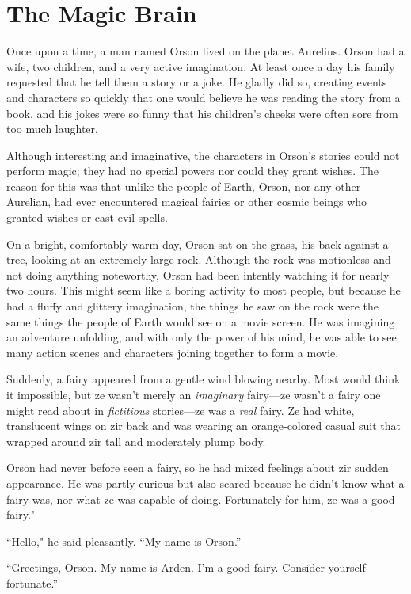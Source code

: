 \chapter{The Magic Brain}

Once upon a time, a man named Orson lived on the planet Aurelius. Orson had a wife, two children, and a very active imagination. At least once a day his family requested that he tell them a story or a joke. He gladly did so, creating events and characters so quickly that one would believe he was reading the story from a book, and his jokes were so funny that his children's cheeks were often sore from too much laughter.

Although interesting and imaginative, the characters in Orson's stories could not perform magic; they had no special powers nor could they grant wishes. The reason for this was that unlike the people of Earth, Orson, nor any other Aurelian, had ever encountered magical fairies or other cosmic beings who granted wishes or cast evil spells.

\timesep

On a bright, comfortably warm day, Orson sat on the grass, his back against a tree, looking at an extremely large rock. Although the rock was motionless and not doing anything noteworthy, Orson had been intently watching it for nearly two hours. This might seem like a boring activity to most people, but because he had a fluffy and glittery imagination, the things he saw on the rock were the same things the people of Earth would see on a movie screen. He was imagining an adventure unfolding, and with only the power of his mind, he was able to see many action scenes and characters joining together to form a movie.

Suddenly, a fairy appeared from a gentle wind blowing nearby. Most would think it impossible, but ze wasn't merely an \emph{imaginary} fairy—ze wasn't a fairy one might read about in \emph{fictitious} stories—ze was a \emph{real} fairy. Ze had white, translucent wings on zir back and was wearing an orange-colored casual suit that wrapped around zir tall and moderately plump body.

Orson had never before seen a fairy, so he had mixed feelings about zir sudden appearance. He was partly curious but also scared because he didn't know what a fairy was, nor what ze was capable of doing. Fortunately for him, ze was a good fairy."

“Hello," he said pleasantly. “My name is Orson.”

“Greetings, Orson. My name is Arden. I'm a good fairy. Consider yourself fortunate.”


